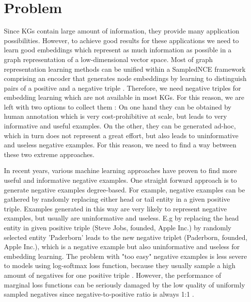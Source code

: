 \chapter{Problem}
\label{ch:problem}

Since \acp{KG} contain large amount of information, they provide many application possibilities.
However, to achieve good results for these applications we need to learn good embeddings which represent as much information as possible in a graph representation of a low-dimensional vector space.
Most of graph representation learning methods can be unified within a \ac{SampledNCE} framework comprising an encoder that generates node embeddings by learning to distinguish pairs of a positive and a negative triple \cite{MCNS}.
Therefore, we need negative triples for embedding learning which are not available in most \acp{KG}.
For this reason, we are left with two options to collect them \cite{safavi2021negater}: 
On one hand they can be obtained by human annotation which is very cost-prohibitive at scale, but leads to very informative and useful examples. 
On the other, they can be generated ad-hoc, which in turn does not represent a great effort, but also leads to uninformative and useless negative examples.
For this reason, we need to find a way between these two extreme approaches.

In recent years, various machine learning approaches have proven to find more useful and informative negative examples.
One straight forward approach is to generate negative examples degree-based.
For example, negative examples can be gathered by randomly replacing either head or tail entity in a given positive triple.
Examples generated in this way are very likely to represent negative examples, but usually are uninformative and useless.
E.g by replacing the head entity in given positive triple (Steve Jobs, founded, Apple Inc.) by randomly selected entity 'Paderborn' leads to the new negative triplet (Paderborn, founded, Apple Inc.), which is a negative example but also uninformative and useless for embedding learning.
The problem with "too easy" negative examples is less severe to models using log-softmax loss function, because they usually sample a high amount of negatives for one positive triple \cite{cai2017kbgan}.
However, the performance of marginal loss functions can be seriously damaged by the low quality of uniformly sampled negatives since negative-to-positive ratio is always 1:1 \cite{cai2017kbgan}.

